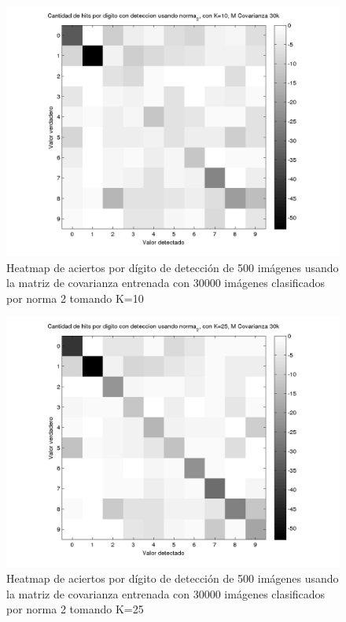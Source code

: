 \begin{figure}[H]
\includegraphics[width=\hmwidth]{plots/heatmap-30kcv-k10-norma_2.png}
\caption{Heatmap de aciertos por d\'igito de detecci\'on de 500 im\'agenes usando la matriz de covarianza entrenada con 30000 im\'agenes
clasificados por norma 2 tomando K=10 }
\label{fig:HM30kcv-k10}
\end{figure}

\begin{figure}[H]
\includegraphics[width=\hmwidth]{plots/heatmap-30kcv-k25-norma_2.png}
\caption{Heatmap de aciertos por d\'igito de detecci\'on de 500 im\'agenes usando la matriz de covarianza entrenada con 30000 im\'agenes
clasificados por norma 2 tomando K=25 }
\label{fig:HM30kcv-k25}
\end{figure}

